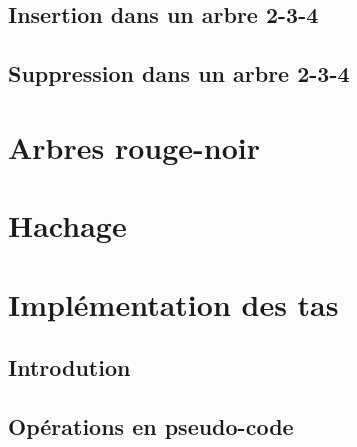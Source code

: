 \documentclass{scrartcl}
\begin{document}
		\subsection{Insertion dans un arbre 2-3-4}
		\subsection{Suppression dans un arbre 2-3-4}
	\section{Arbres rouge-noir}
	\section{Hachage}
	\section{Implémentation des tas}
		\subsection{Introdution}
		\subsection{Opérations en pseudo-code}
\end{document}
